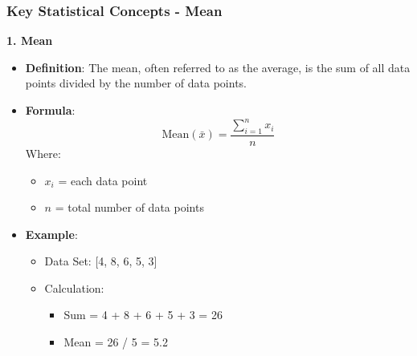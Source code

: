\documentclass[aspectratio=169]{beamer}
\begin{document}
\begin{frame}[fragile]
    \frametitle{Key Statistical Concepts - Mean}
    \textbf{1. Mean}
    
    \begin{itemize}
        \item \textbf{Definition}: The mean, often referred to as the average, is the sum of all data points divided by the number of data points.
        \item \textbf{Formula}:
            \begin{equation}
            \text{Mean} (\bar{x}) = \frac{\sum_{i=1}^{n} x_i}{n}
            \end{equation}
            Where:
            \begin{itemize}
                \item \(x_i\) = each data point
                \item \(n\) = total number of data points
            \end{itemize}
        \item \textbf{Example}:
            \begin{itemize}
                \item Data Set: [4, 8, 6, 5, 3]
                \item Calculation:
                    \begin{itemize}
                        \item Sum = 4 + 8 + 6 + 5 + 3 = 26
                        \item Mean = 26 / 5 = 5.2
                    \end{itemize}
            \end{itemize}
    \end{itemize}
\end{frame}
\end{document}

